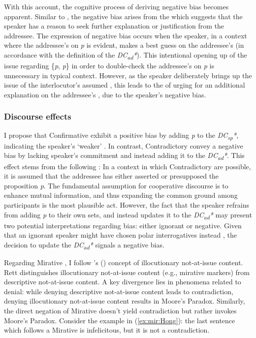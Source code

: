 \documentclass[output=paper,colorlinks,citecolor=brown]{langscibook}
\begin{document}
With this account, the cognitive process of deriving negative bias becomes apparent. Similar to \citet{jeong2018intonation}, the negative bias arises from the  which suggests that the speaker has a reason to seek further explanation or justification from the addressee. The expression of negative bias occurs when the speaker, in a context where the addressee’s  on \textit{p} is evident, makes a best guess on the addressee’s  (in accordance with the definition of the \textit{DC\textsubscript{ad}*}). This intentional opening up of the issue regarding \{\textit{p}, \textit{\neg p}\} in order to double-check the addressee’s  on \textit{p} is unnecessary in typical context. However, as the speaker deliberately brings up the issue of the interlocutor’s assumed , this leads to the  of urging for an additional explanation on the addressee’s , due to the speaker’s negative bias.

\subsubsection{Discourse effects}
\label{sec:irdde:Hong}

I propose that Confirmative  exhibit a positive bias by adding \textit{p} to the \textit{DC\textsubscript{sp}*}, indicating the speaker’s ‘weaker’ . In contrast, Contradictory  convey a negative bias by lacking speaker’s commitment and instead adding it to the \textit{DC\textsubscript{ad}*}. This effect stems from the following : In a context in which Contradictory  are possible, it is assumed that the addressee has either asserted or presupposed the proposition \textit{p}. The fundamental assumption for cooperative discourse is to enhance mutual information, and thus expanding the common ground among participants is the most plausible act. However, the fact that the speaker refrains from adding \textit{p} to their own  sets, and instead updates it to the \textit{DC\textsubscript{ad}*} may present two potential interpretations regarding bias: either ignorant or negative. Given that an ignorant speaker might have chosen polar interrogatives instead \citep{goodhue2022isn}, the decision to update the \textit{DC\textsubscript{ad}*} signals a negative bias.

Regarding Mirative , I follow \citeauthor{rett2021semantics}'s (\citeyear{rett2021semantics}) concept of illocutionary not-at-issue content. Rett distinguishes illocutionary not-at-issue content (e.g., mirative markers) from descriptive not-at-issue content. A key divergence lies in phenomena related to denial: while denying descriptive not-at-issue content leads to contradiction, denying illocutionary not-at-issue content results in Moore’s Paradox. Similarly, the direct negation of Mirative  doesn't yield contradiction but rather invokes Moore’s Paradox. Consider the example in (\ref{ex:mir:Hong}): the last sentence which follows a Mirative  is infelicitous, but it is not a contradiction. 
\end{document}
